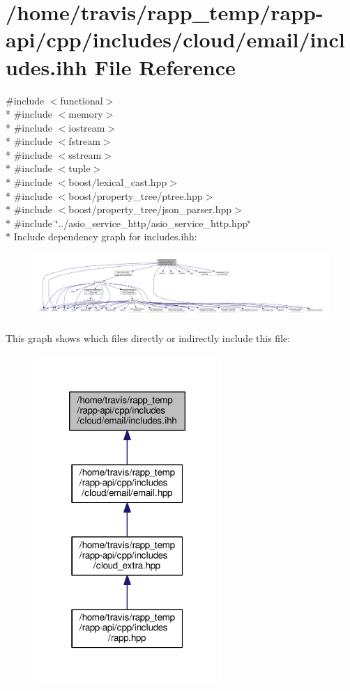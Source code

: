 \hypertarget{cloud_2email_2includes_8ihh}{\section{/home/travis/rapp\-\_\-temp/rapp-\/api/cpp/includes/cloud/email/includes.ihh File Reference}
\label{cloud_2email_2includes_8ihh}
}
{\ttfamily \#include $<$functional$>$}\\*
{\ttfamily \#include $<$memory$>$}\\*
{\ttfamily \#include $<$iostream$>$}\\*
{\ttfamily \#include $<$fstream$>$}\\*
{\ttfamily \#include $<$sstream$>$}\\*
{\ttfamily \#include $<$tuple$>$}\\*
{\ttfamily \#include $<$boost/lexical\-\_\-cast.\-hpp$>$}\\*
{\ttfamily \#include $<$boost/property\-\_\-tree/ptree.\-hpp$>$}\\*
{\ttfamily \#include $<$boost/property\-\_\-tree/json\-\_\-parser.\-hpp$>$}\\*
{\ttfamily \#include \char`\"{}../asio\-\_\-service\-\_\-http/asio\-\_\-service\-\_\-http.\-hpp\char`\"{}}\\*
Include dependency graph for includes.\-ihh\-:
\nopagebreak
\begin{figure}[H]
\begin{center}
\leavevmode
\includegraphics[width=350pt]{cloud_2email_2includes_8ihh__incl}
\end{center}
\end{figure}
This graph shows which files directly or indirectly include this file\-:
\nopagebreak
\begin{figure}[H]
\begin{center}
\leavevmode
\includegraphics[width=202pt]{cloud_2email_2includes_8ihh__dep__incl}
\end{center}
\end{figure}
